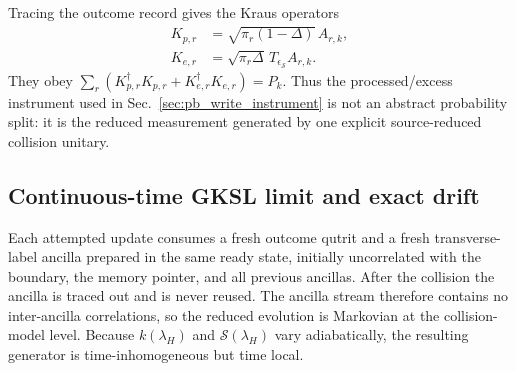 \documentclass[aps,prd,twocolumn,10pt,superscriptaddress,nofootinbib]{revtex4-2}
\begin{document}
Tracing the outcome record gives the Kraus operators
\begin{align}
 K_{p,r}&=\sqrt{\pi_r(1-\Delta)}\,A_{r,k},
 \label{eq:pb_processed_kraus}\\
 K_{e,r}&=\sqrt{\pi_r\Delta}\,
 T_{\epsilon_{\mathcal S}}A_{r,k}.
 \label{eq:pb_excess_kraus}
\end{align}
They obey $\sum_r(K_{p,r}^{\dagger}K_{p,r}+
K_{e,r}^{\dagger}K_{e,r})=P_k$.  Thus the processed/excess instrument used
in Sec.~\ref{sec:pb_write_instrument} is not an abstract probability split:
it is the reduced measurement generated by one explicit source-reduced
collision unitary.

\subsection{Continuous-time GKSL limit and exact drift}

Each attempted update consumes a fresh outcome qutrit and a fresh
transverse-label ancilla prepared in the same ready state, initially
uncorrelated with the boundary, the memory pointer, and all previous
ancillas.  After the collision the ancilla is traced out and is never reused.
The ancilla stream therefore contains no inter-ancilla correlations, so the
reduced evolution is Markovian at the collision-model level.  Because
$k(\lambda_H)$ and $\mathcal S(\lambda_H)$ vary adiabatically, the resulting
generator is time-inhomogeneous but time local.
\end{document}
